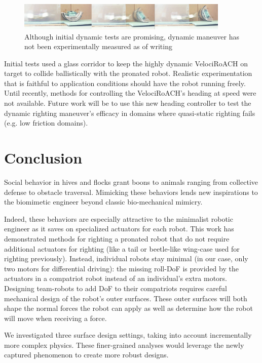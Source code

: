 \documentclass[letterpaper]{report}
\begin{document}
\begin{figure}[ht]
  \centering
  \includegraphics[width=0.9\textwidth]{DynamicPromiseStrip.jpg}
  \caption{\label{fig:DynamicFlipRealLife}Although initial dynamic tests are promising, dynamic maneuver has not been experimentally measured as of writing}
\end{figure}

Initial tests used a glass corridor to keep the highly dynamic VelociRoACH on target to collide ballistically with the pronated robot.
Realistic experimentation that is faithful to application conditions should have the robot running freely.
Until recently, methods for controlling the VelociRoACH's heading at speed were not available.
Future work will be to use this new heading controller to test the dynamic righting maneuver's efficacy in domains where quasi-static righting fails (e.g. low friction domains).

\chapter{Conclusion}
Social behavior in hives and flocks grant boons to animals ranging from collective defense to obstacle traversal.
Mimicking these behaviors lends new inspirations to the biomimetic engineer beyond classic bio-mechanical mimicry.

Indeed, these behaviors are especially attractive to the minimalist robotic engineer as it saves on specialized actuators for each robot.
This work has demonstrated methods for righting a pronated robot that do not require additional actuators for righting (like a tail \cite{casarezTailRighting} or beetle-like wing-case \cite{li2016cockroach} used for righting previously).
Instead, individual robots stay minimal (in our case, only two motors for differential driving): the missing roll-DoF is provided by the actuators in a compatriot robot instead of an individual's extra motors.
Designing team-robots to add DoF to their compatriots requires careful mechanical design of the robot's outer surfaces.
These outer surfaces will both shape the normal forces the robot can apply as well as determine how the robot will move when receiving a force.

We investigated three surface design settings, taking into account incrementally more complex physics.
These finer-grained analyses would leverage the newly captured phenomenon to create more robust designs.
\end{document}
